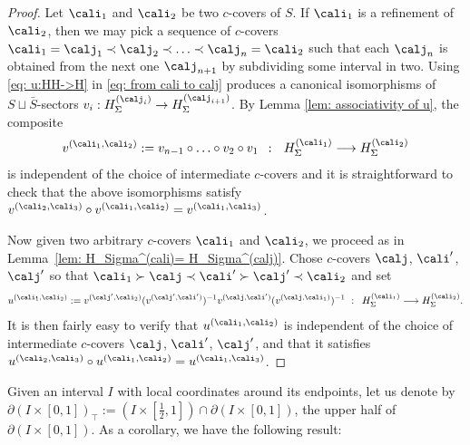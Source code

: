 \documentclass[a4paper,10pt,leqno]{amsart}
\theoremstyle{plain}
\theoremstyle{definition}
\theoremstyle{remark}
\begin{document}
\begin{proof}
Let $\cali_1$ and $\cali_2$ be two $c$-covers of $S$.
If $\cali_1$ is a refinement of $\cali_2$, then we may pick a sequence of $c$-covers
$\cali_1=\calj_1\prec \calj_2\prec \ldots\prec \calj_n=\cali_2$
such that each $\calj_n$ is obtained from the next one $\calj_{n+1}$
by subdividing some interval in two.
Using \eqref{eq: u:HH->H} in \eqref{eq: from cali to calj} produces a canonical
isomorphisms of $S\sqcup \bar S$-sectors $v_i:H_\Sigma^{(\calj_i)}\to H_\Sigma^{(\calj_{i+1})}$.
By Lemma \ref{lem: associativity of u}, the composite
\[
v^{(\cali_1,\cali_2)}:=v_{n-1}\circ \ldots \circ v_2\circ v_1\,\,\,:\,\,\,\,H_\Sigma^{(\cali_1)}\longrightarrow H_\Sigma^{(\cali_2)}
\]
is independent of the choice of intermediate $c$-covers and it is straightforward to check that
the above isomorphisms satisfy $v^{(\cali_2,\cali_3)}\circ v^{(\cali_1,\cali_2)}=v^{(\cali_1,\cali_3)}$.

Now given two arbitrary $c$-covers $\cali_1$ and $\cali_2$, we proceed as in Lemma~\ref{lem: H_Sigma^(cali)= H_Sigma^(calj)}.
Chose $c$-covers $\calj$, $\cali'$, $\calj'$ so that $\cali_1\succ \calj\prec \cali'\succ \calj'\prec \cali_2$
and set
\begin{equation*}
u^{(\cali_1,\cali_2)}:=v^{(\calj',\cali_2)} (v^{(\calj',\cali')})^{-1} v^{(\calj,\cali')} (v^{(\calj,\cali_1)})^{-1}\,\,:\,\,\,H_\Sigma^{(\cali_1)}\longrightarrow H_\Sigma^{(\cali_2)}.
\end{equation*}
It is then fairly easy to verify that $u^{(\cali_1,\cali_2)}$ is independent of the choice of intermediate $c$-covers $\calj$, $\cali'$, $\calj'$,
and that it satisfies $u^{(\cali_2,\cali_3)}\circ u^{(\cali_1,\cali_2)}=u^{(\cali_1,\cali_3)}$.
\end{proof}

Given an interval $I$ with local coordinates around its endpoints, let us denote by $\partial(I\times [0,1])_\top:=(I\times [{\textstyle \frac12},1])\cap \partial (I\times [0,1])$, the upper half of $\partial(I\times [0,1])$.
As a corollary, we have the following result:
\end{document}
